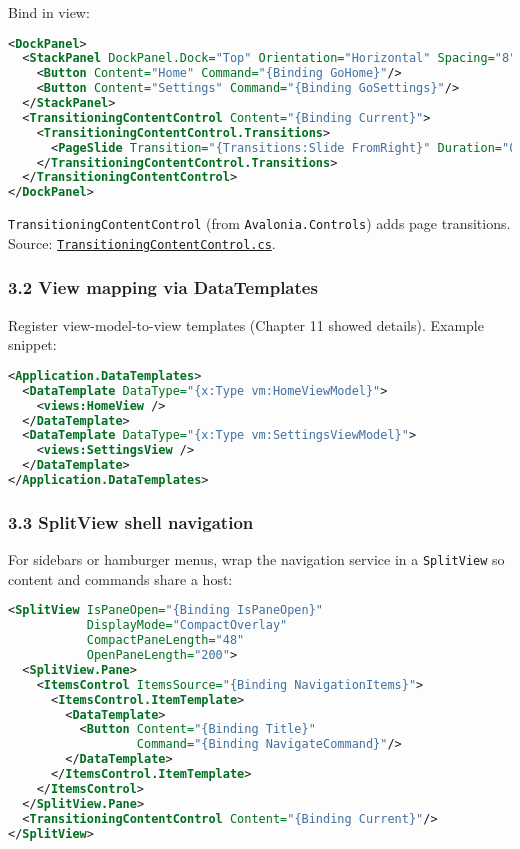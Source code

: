 Bind in view:

\begin{lstlisting}[language=XML]
<DockPanel>
  <StackPanel DockPanel.Dock="Top" Orientation="Horizontal" Spacing="8">
    <Button Content="Home" Command="{Binding GoHome}"/>
    <Button Content="Settings" Command="{Binding GoSettings}"/>
  </StackPanel>
  <TransitioningContentControl Content="{Binding Current}">
    <TransitioningContentControl.Transitions>
      <PageSlide Transition="{Transitions:Slide FromRight}" Duration="0:0:0.2"/>
    </TransitioningContentControl.Transitions>
  </TransitioningContentControl>
</DockPanel>
\end{lstlisting}

\passthrough{\lstinline!TransitioningContentControl!} (from
\passthrough{\lstinline!Avalonia.Controls!}) adds page transitions.
Source:
\href{https://github.com/AvaloniaUI/Avalonia/blob/master/src/Avalonia.Controls/TransitioningContentControl.cs}{\passthrough{\lstinline!TransitioningContentControl.cs!}}.

\subsubsection{3.2 View mapping via
DataTemplates}\label{view-mapping-via-datatemplates}

Register view-model-to-view templates (Chapter 11 showed details).
Example snippet:

\begin{lstlisting}[language=XML]
<Application.DataTemplates>
  <DataTemplate DataType="{x:Type vm:HomeViewModel}">
    <views:HomeView />
  </DataTemplate>
  <DataTemplate DataType="{x:Type vm:SettingsViewModel}">
    <views:SettingsView />
  </DataTemplate>
</Application.DataTemplates>
\end{lstlisting}

\subsubsection{3.3 SplitView shell
navigation}\label{splitview-shell-navigation}

For sidebars or hamburger menus, wrap the navigation service in a
\passthrough{\lstinline!SplitView!} so content and commands share a
host:

\begin{lstlisting}[language=XML]
<SplitView IsPaneOpen="{Binding IsPaneOpen}"
           DisplayMode="CompactOverlay"
           CompactPaneLength="48"
           OpenPaneLength="200">
  <SplitView.Pane>
    <ItemsControl ItemsSource="{Binding NavigationItems}">
      <ItemsControl.ItemTemplate>
        <DataTemplate>
          <Button Content="{Binding Title}"
                  Command="{Binding NavigateCommand}"/>
        </DataTemplate>
      </ItemsControl.ItemTemplate>
    </ItemsControl>
  </SplitView.Pane>
  <TransitioningContentControl Content="{Binding Current}"/>
</SplitView>
\end{lstlisting}

